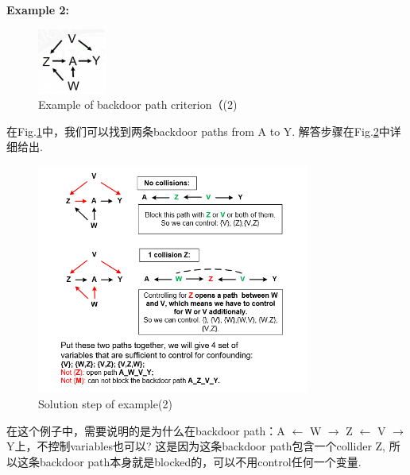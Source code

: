 {\bfseries Example 2:} 
\begin{figure}[htbp]
	\setlength{\abovecaptionskip}{0pt}     %
	\setlength{\belowcaptionskip}{10pt}
	\vspace{-0cm}  %
	\setlength{\abovecaptionskip}{-0cm}   %
	\setlength{\belowcaptionskip}{-0cm}   %
	\centering
	\includegraphics[width=0.2\textwidth]{figure/bckdrcrtex2.png}
	\caption{Example of backdoor path criterion（(2)}
	\label{bckdrcrtex2}
\end{figure}
在Fig.\ref{bckdrcrtex2}中，我们可以找到两条backdoor paths from A to Y. 解答步骤在Fig.\ref{answerbckdrcrtex2}中详细给出.
\begin{figure}[htbp]
	\setlength{\abovecaptionskip}{0pt}     %
	\setlength{\belowcaptionskip}{10pt}
	\vspace{-0cm}  %
	\setlength{\abovecaptionskip}{-0cm}   %
	\setlength{\belowcaptionskip}{-0cm}   %
	\centering
	\includegraphics[width=0.8\textwidth]{figure/answerbckdrcrtex2.png}
	\caption{Solution step of example(2)}
	\label{answerbckdrcrtex2}
\end{figure}
在这个例子中，需要说明的是为什么在backdoor path：A $\longleftarrow$ W $\longrightarrow$ Z $\longleftarrow$ V $\longrightarrow$ Y上，不控制variables也可以?  这是因为这条backdoor path包含一个collider Z, 所以这条backdoor path本身就是blocked的，可以不用control任何一个变量.


